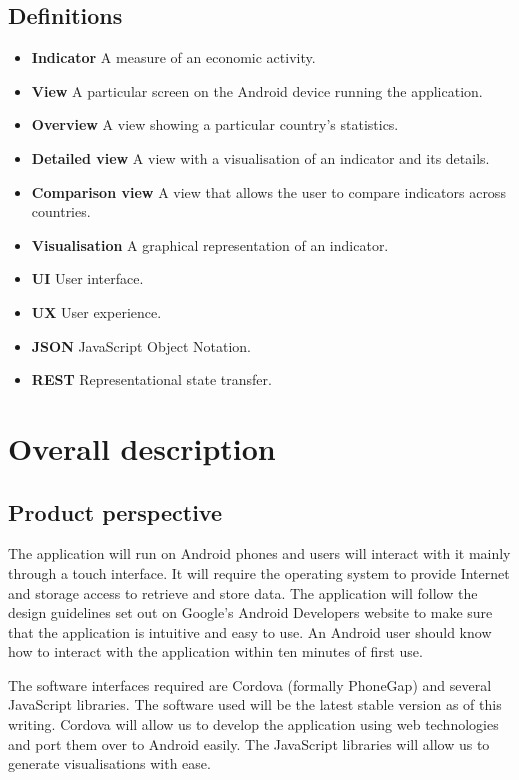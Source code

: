 \documentclass[12pt,a4paper,twoside]{article}
\begin{document}
\subsection{Definitions}
\begin{itemize}
	\item \textbf{Indicator} A measure of an economic activity.
	\item \textbf{View} A particular screen on the Android device running the application.
	\item \textbf{Overview} A view showing a particular country's statistics.
	\item \textbf{Detailed view} A view with a visualisation of an indicator and its details.
	\item \textbf{Comparison view} A view that allows the user to compare indicators across countries.
	\item \textbf{Visualisation} A graphical representation of an indicator.
	\item \textbf{UI} User interface.
	\item \textbf{UX} User experience.
	\item \textbf{JSON} JavaScript Object Notation.
	\item \textbf{REST} Representational state transfer.
\end{itemize}

\section{Overall description}

\subsection{Product perspective}
The application will run on Android phones and users will interact with it mainly through a touch interface. It will require the operating system to provide Internet and storage access to retrieve and store data. The application will follow the design guidelines set out on Google's Android Developers website to make sure that the application is intuitive and easy to use. An Android user should know how to interact with the application within ten minutes of first use.

The software interfaces required are Cordova (formally PhoneGap) and several JavaScript libraries. The software used will be the latest stable version as of this writing. Cordova will allow us to develop the application using web technologies and port them over to Android easily. The JavaScript libraries will allow us to generate visualisations with ease.
\end{document}
